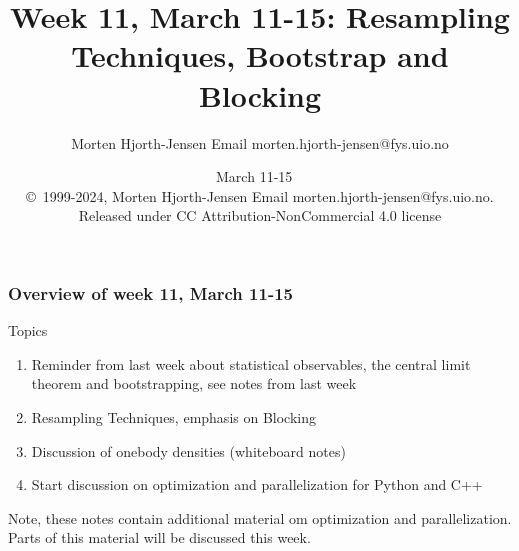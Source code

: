 \documentclass{beamer}
\begin{document}

\newcommand{\exercisesection}[1]{\subsection*{#1}}







\title{Week 11, March 11-15: Resampling Techniques, Bootstrap and Blocking}


\author{Morten Hjorth-Jensen  Email morten.hjorth-jensen@fys.uio.no}

\date{March 11-15
\ \\ 
{\tiny \copyright\ 1999-2024, Morten Hjorth-Jensen  Email morten.hjorth-jensen@fys.uio.no. Released under CC Attribution-NonCommercial 4.0 license}
}

\begin{frame}
\titlepage
\end{frame}

\begin{frame}
\frametitle{Overview of week 11, March 11-15}

\begin{block}{Topics }
\begin{enumerate}
\item Reminder from last week about statistical observables, the central limit theorem and bootstrapping, see notes from last week

\item Resampling Techniques, emphasis on  Blocking 

\item Discussion of onebody densities (whiteboard notes)

\item Start discussion on optimization and parallelization for Python and C++
\end{enumerate}

\noindent
\end{block}

Note, these notes contain additional material om optimization and parallelization. Parts of this material will be discussed this week.
\end{frame}
\end{document}
